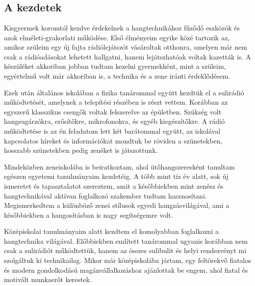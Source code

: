 \chapter{\bevezetes}

\section{A kezdetek}
Kisgyermek koromtól kezdve érdekelnek a hangtechnikához fűződő eszközök és azok elméleti-gyakorlati működése. Első élményeim egyike közé tartozik az, amikor
szüleim egy új fajta rádiólejátszót vásároltak otthonra, amelyen már nem csak a rádióadásokat lehetett hallgatni, hanem lejátszhatóak voltak kazetták is.
A készüléket akkoriban jobban tudtam kezelni gyermekként, mint a szüleim, egyértelmű volt már akkoriban is, a technika és a zene iránti érdeklődésem. 

Ezek után általános iskolában a fizika tanárommal együtt kezdtük el a sulirádió működtetését, amelynek a telepítési részében is részt vettem.
Korábban az egyszerű klasszikus csengők voltak felszerelve az épületben. Szükség volt hangsugárzókra, erősítőkre, mikrofonokra, és egyéb kiegészítőkre. A rádió működtetése
is az én feladatom lett két barátommal együtt, az iskolával kapcsolatos híreket és információkat mondtuk be röviden a szünetekben, hosszabb szünetekben pedig zenéket is játszottunk.

Mindeközben zeneiskolába is beiratkoztam, ahol ütőhangszeresként tanultam egészen egyetemi tanulmányaim kezdetéig. A több mint tíz év alatt, sok új ismeretet és tapasztalatot szereztem,
amit a későbbiekben mint zenész és hangtechnikával aktívan foglalkozó szakember tudtam hasznosítani. Megismerkedtem a különböző zenei stílusok egyedi hangzásvilágával, ami a későbbiekben a hangosításban is nagy segítségemre volt.

Középiskolai tanulmányaim alatt kezdtem el komolyabban foglalkozni a hangtechnika világával.
Előbbiekben említett tanárommal ugyanis korábban nem csak a sulirádiót működtettük, hanem az összes sulibulit és helyi rendezvényt mi szolgáltuk ki technikailag.
Mikor már középiskolába jártam, egy feltörekvő fiatalos és modern gondolkodású magánvállalkozáshoz ajánlottak be engem, ahol fiatal és motivált munkaerőt kerestek.

